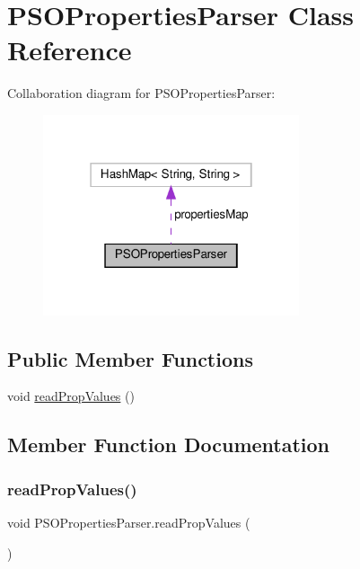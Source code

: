 \hypertarget{class_p_s_o_properties_parser}{}\section{P\+S\+O\+Properties\+Parser Class Reference}
\label{class_p_s_o_properties_parser}


Collaboration diagram for P\+S\+O\+Properties\+Parser\+:
\nopagebreak
\begin{figure}[H]
\begin{center}
\leavevmode
\includegraphics[width=214pt]{class_p_s_o_properties_parser__coll__graph}
\end{center}
\end{figure}
\subsection*{Public Member Functions}
\begin{DoxyCompactItemize}
\item 
void \hyperlink{class_p_s_o_properties_parser_ada14427c13fa9eb803da420099dcd0c6}{read\+Prop\+Values} ()
\end{DoxyCompactItemize}


\subsection{Member Function Documentation}
\mbox{\label{class_p_s_o_properties_parser_ada14427c13fa9eb803da420099dcd0c6}} 
\subsubsection{\texorpdfstring{read\+Prop\+Values()}{readPropValues()}}
{\footnotesize\ttfamily void P\+S\+O\+Properties\+Parser.\+read\+Prop\+Values (\begin{DoxyParamCaption}{ }\end{DoxyParamCaption})}

